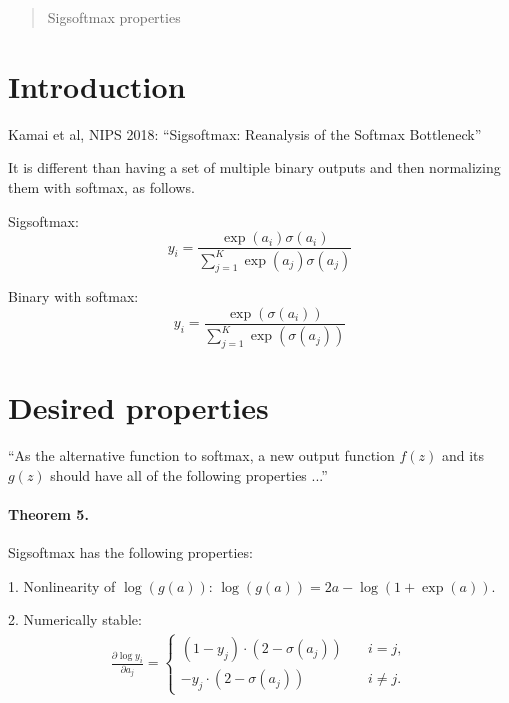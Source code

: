 \begin{abstract}
Sigsoftmax properties
\end{abstract}

\section{Introduction}
\label{intro}

Kamai et al, NIPS 2018: ``Sigsoftmax: Reanalysis of the Softmax Bottleneck''

It is different than having a set of multiple binary outputs and then normalizing them with softmax, as follows.

Sigsoftmax:
\begin{equation}
y_i = \frac{\exp(a_i) \sigma(a_i)}{\sum_{j=1}^K \exp(a_j) \sigma(a_j)}
\label{eq: sigsoftmax}
\end{equation}

Binary with softmax:
\begin{equation}
y_i = \frac{\exp(\sigma(a_i))}{\sum_{j=1}^K \exp(\sigma(a_j)) }
\label{eq: binary with softmax}
\end{equation}

\section{Desired properties}
\label{sec:1}


``As the alternative function to softmax, a new output function $f(z)$ and its $g(z)$ should have all of the following properties ...''

\paragraph{Theorem 5.} Sigsoftmax has the following properties:

1. Nonlinearity of $\log(g(a))$: $\log(g(a)) = 2 a - \log(1 + \exp(a))$.

2. Numerically stable:
\begin{eqnarray}
\frac{\partial \log y_i}{\partial a_j}
= \left\{
\begin{array}{ll}
(1 - y_j) \cdot (2 - \sigma(a_j)) &\quad i = j, \\
-y_j \cdot (2 - \sigma(a_j)) &\quad i \neq j.
\end{array}
\right.
\end{eqnarray}

